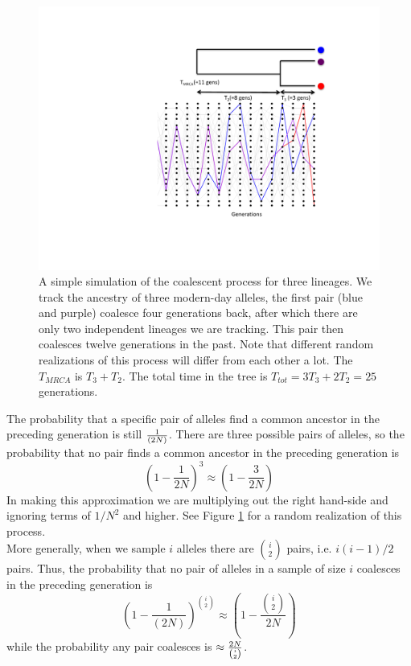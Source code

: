 \begin{figure}
\begin{center}
  \includegraphics[width = 0.75 \textwidth]{figures/Coalescent/Coal_three_lineages.pdf}
\end{center}
\caption{A simple simulation of the coalescent process for three
  lineages. We track the ancestry of 
  three modern-day alleles, the first pair (blue and purple) coalesce four generations back, after which  
  there are only two independent lineages we are tracking. This pair
  then coalesces twelve generations in the past. Note that different
  random realizations of this process will differ from each other a lot. The $T_{MRCA}$ is $T_3+T_2$. The total time in the tree is $T_{tot}=3T_3 + 2T_2= 25$ generations.  } \label{fig:Coalescent_simulation_3}
\end{figure}

The probability that a specific pair of alleles find a common ancestor in the
preceding generation is still $\nicefrac{1}{(2N)}$. There are three possible pairs of
alleles, so the probability that no pair finds a common ancestor in the preceding generation is
\begin{equation}
\left(1-\frac{1}{2N} \right)^3 \approx \left( 1- \frac{3}{2N} \right)
\end{equation}
In making this approximation we are multiplying out the right hand-side
and ignoring terms of $1/N^2$ and higher. See
Figure \ref{fig:Coalescent_simulation_3} for a random realization of this process. \\

More generally, when we sample $i$ alleles there are ${i \choose 2}$
pairs,  i.e. $i(i-1)/2$ pairs. Thus, the probability that no pair
of alleles in a sample of size $i$ coalesces in the preceding generation is
\begin{equation}
\left(1-\frac{1}{(2N)} \right)^{{i \choose
 2}} \approx \left( 1- \frac{{i \choose
 2}}{2N}\right)
\end{equation}
while the probability any pair coalesces is $\approx \nicefrac{2N}{{i \choose
 2}}$.\\

